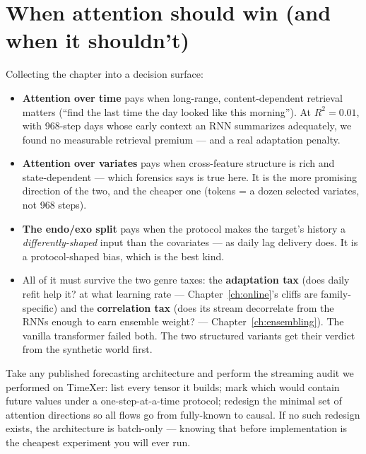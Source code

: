 \section{When attention should win (and when it shouldn't)}

Collecting the chapter into a decision surface:

\begin{itemize}
\item \textbf{Attention over time} pays when long-range, content-dependent
  retrieval matters (``find the last time the day looked like this
  morning''). At $R^2 = 0.01$, with 968-step days whose early context an
  RNN summarizes adequately, we found no measurable retrieval premium ---
  and a real adaptation penalty.
\item \textbf{Attention over variates} pays when cross-feature structure
  is rich and state-dependent --- which forensics says is true here. It
  is the more promising direction of the two, and the cheaper one (tokens
  = a dozen selected variates, not 968 steps).
\item \textbf{The endo/exo split} pays when the protocol makes the
  target's history a \emph{differently-shaped} input than the covariates
  --- as daily lag delivery does. It is a protocol-shaped bias, which is
  the best kind.
\item All of it must survive the two genre taxes: the \textbf{adaptation
  tax} (does daily refit help it? at what learning rate ---
  Chapter~\ref{ch:online}'s cliffs are family-specific) and the
  \textbf{correlation tax} (does its stream decorrelate from the RNNs
  enough to earn ensemble weight? --- Chapter~\ref{ch:ensembling}).
  The vanilla transformer failed both. The two structured variants get
  their verdict from the synthetic world first.
\end{itemize}

\begin{drillbox}
Take any published forecasting architecture and perform the streaming
audit we performed on TimeXer: list every tensor it builds; mark which
would contain future values under a one-step-at-a-time protocol; redesign
the minimal set of attention directions so all flows go from
fully-known to causal. If no such redesign exists, the architecture is
batch-only --- knowing that before implementation is the cheapest
experiment you will ever run.
\end{drillbox}
